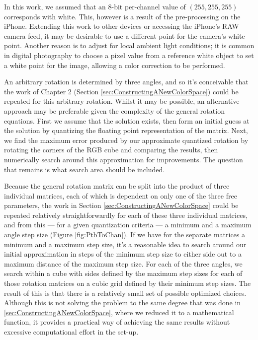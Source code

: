 In this work, we assumed that an 8-bit per-channel value of $(255, 255, 255)$ corresponds with white. This, however is a result of the pre-processing on the iPhone. Extending this work to other devices or accessing the iPhone's RAW camera feed, it may be desirable to use a different point for the camera's white point. Another reason is to adjust for local ambient light conditions; it is common in digital photography to choose a pixel value from a reference white object to set a white point for the image, allowing a color correction to be performed.

An arbitrary rotation is determined by three angles, and so it's conceivable that the work of Chapter 2 (Section \ref{sec:ConstructingANewColorSpace}) could be repeated for this arbitrary rotation. Whilst it may be possible, an alternative approach may be preferable given the complexity of the general rotation equations. First we assume that the solution exists, then form an initial guess at the solution by quantizing the floating point representation of the matrix. Next, we find the maximum error produced by our approximate quantized rotation by rotating the corners of the RGB cube and comparing the results, then numerically search around this approximation for improvements. The question that remains is what search area should be included.

Because the general rotation matrix can be split into the product of three individual matrices, each of which is dependent on only one of the three free parameters, the work in Section \ref{sec:ConstructingANewColorSpace} could be repeated relatively straightforwardly for each of these three individual matrices, and from this --- for a given quantization criteria --- a minimum and a maximum angle step size (Figure \ref{fig:PtbToChan}). If we have for the separate matrices a minimum and a maximum step size, it's a reasonable idea to search around our initial approximation in steps of the minimum step size to either side out to a maximum distance of the maximum step size. For each of the three angles, we search within a cube with sides defined by the maximum step sizes for each of those rotation matrices on a cubic grid defined by their minimum step sizes. The result of this is that there is a relatively small set of possible optimized choices. Although this is not solving the problem to the same degree that was done in \ref{sec:ConstructingANewColorSpace}, where we reduced it to a mathematical function, it provides a practical way of achieving the same results without excessive computational effort in the set-up. 

